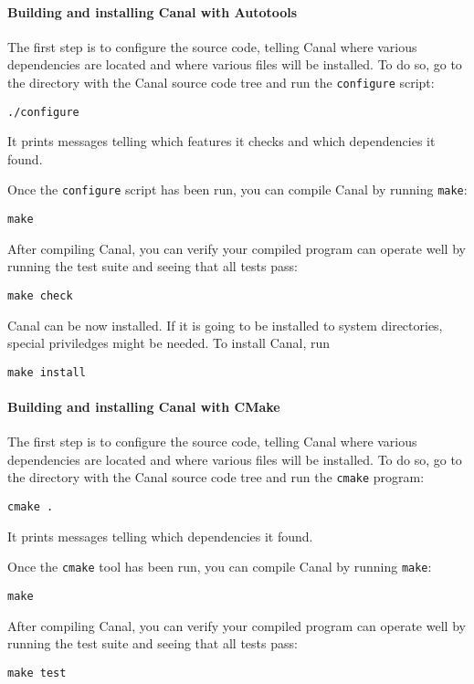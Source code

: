 \documentclass[a4paper]{book}
\begin{document}
\paragraph*{Building and installing Canal with Autotools}
The first step is to configure the source code, telling Canal where
various dependencies are located and where various files will be
installed.  To do so, go to the directory with the Canal source code
tree and run the \texttt{configure} script:

\texttt{./configure}

It prints messages telling which features it checks and which
dependencies it found.

Once the \texttt{configure} script has been run, you can compile Canal
by running \texttt{make}:

\texttt{make}

After compiling Canal, you can verify your compiled program can
operate well by running the test suite and seeing that all tests pass:

\texttt{make check}

Canal can be now installed. If it is going to be installed to system
directories, special priviledges might be needed.  To install Canal,
run

\texttt{make install}

\paragraph*{Building and installing Canal with CMake}
The first step is to configure the source code, telling Canal where
various dependencies are located and where various files will be
installed.  To do so, go to the directory with the Canal source code
tree and run the \texttt{cmake} program:

\texttt{cmake .}

It prints messages telling which dependencies it found.

Once the \texttt{cmake} tool has been run, you can compile Canal by
running \texttt{make}:

\texttt{make}

After compiling Canal, you can verify your compiled program can
operate well by running the test suite and seeing that all tests pass:

\texttt{make test}

\end{document}
